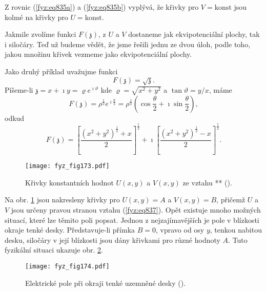   Z rovnic (\ref{fyz:eq835a}) a (\ref{fyz:eq835b}) vyplývá, že křivky pro \(V=\text{konst}\) jsou
  kolmé na křivky pro \(U= \text{konst}\).
  
  Jakmile zvolíme funkci \(F(\mathfrak{z})\), z \(U\) a \(V\) dostaneme jak ekvipotenciální plochy,
  tak i siločáry. Teď už budeme vědět, že jsme řešili jednu ze dvou úloh, podle toho, jakou množinu
  křivek vezmeme jako ekvipotenciální plochy.

  Jako druhý příklad uvažujme funkci
  \begin{equation}\label{fyz:eq836}
    F(\mathfrak{z}) = \sqrt{\mathfrak{z}}.
  \end{equation}
  Píšeme-li \(\mathfrak{z} = x + \imath y = \varrho e^{\imath\vartheta}\) kde \(\varrho = \sqrt{x^2
  + y^2}\) a \(\tan\vartheta = y/x\), máme
  \begin{equation*}
    F(\mathfrak{z}) = ρ^{\frac{1}{2}}e^{\imath\frac{θ}{2}} 
                    = ρ^\frac{1}{2}\left(\cos\dfrac{θ}{2}+\imath\sin\dfrac{θ}{2}\right),
  \end{equation*}
  odkud
  \begin{equation}\label{fyz:eq837}
    F(\mathfrak{z})=\left[\dfrac{(x^2 + y^2)^\frac{1}{2} + x}{2}\right]^\frac{1}{2} 
            + \imath\left[\dfrac{(x^2 + y^2)^\frac{1}{2} − x}{2}\right]^\frac{1}{2}.
  \end{equation}

  \begin{figure}[ht!]  %
    \centering
    \texttt{[image: fyz\_fig173.pdf]}
    \caption{Křivky konstantních hodnot \(U(x, y)\) a \(V(x, y)\) ze vztahu **
             (\cite[s.~128]{Feynman02}).}
    \label{fyz:fig173}
  \end{figure}

  Na obr. \ref{fyz:fig173} jsou nakresleny křivky pro \(U(x,y)=A\) a \(V(x,y) = B\), přičemž \(U\)
  a \(V\) jsou určeny pravou stranou vztahu (\ref{fyz:eq837}). Opět existuje mnoho možných situací,
  které lze těmito poli popsat. Jednou z nejzajímavějších je pole v blízkosti okraje tenké desky.
  Představuje-li přímka \(B = 0\), vpravo od osy \(y\), tenkou nabitou desku, siločáry v její
  blízkosti jsou dány křivkami pro různé hodnoty \(A\). Tuto fyzikální situaci ukazuje obr.
  \ref{fyz:fig174}.

  \begin{figure}[ht!]  %
    \centering
    \texttt{[image: fyz\_fig174.pdf]}
    \caption{Elektrické pole při okraji tenké uzemněné desky
             (\cite[s.~128]{Feynman02}).}
    \label{fyz:fig174}
  \end{figure}

